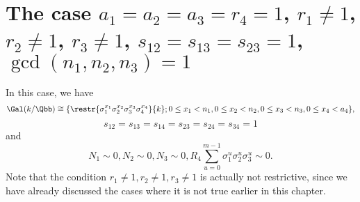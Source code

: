 \section{The case $a_1=a_2=a_3=r_4=1$, $r_1\neq 1$, $r_2\neq 1$, $r_3 \neq 1$, $s_{12}=s_{13}=s_{23}=1$, $\gcd(n_1,n_2,n_3)=1$}
In this case, we have
\begin{equation*}
\Gal(k/\Qbb)\cong
 \{\restr{\sigma_1^{x_1}\sigma_2^{x_2}\sigma_3^{x_3}\sigma_4^{x_4}}{k};  0\leq x_1<n_1, 0\leq x_2<n_2,  0\leq x_3<n_3,0\leq x_4<a_4\},
\end{equation*}
 $$s_{12}=s_{13}=s_{14}=s_{23}=s_{24}=s_{34}=1$$
and $$N_1\sim 0, N_2\sim 0, N_3\sim 0, R_4\sum_{u=0}^{m-1}\sigma_1^u\sigma_2^u\sigma_3^u\sim0.$$
Note that the condition $r_1\neq 1, r_2\neq 1, r_3 \neq 1$ is actually not restrictive, since we have already discussed the cases where it is not true earlier in this chapter. %

